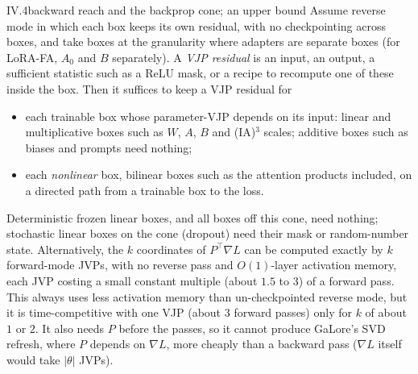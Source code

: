 \begin{observation}{IV.4}{backward reach and the backprop cone; an upper bound}
Assume reverse mode in which each box keeps its own residual, with no checkpointing across boxes, and take boxes at the
granularity where adapters are separate boxes (for LoRA-FA, $A_0$ and $B$ separately). A \emph{VJP residual} is an
input, an output, a sufficient statistic such as a ReLU mask, or a recipe to recompute one of these inside the box.
Then it suffices to keep a VJP residual for
\begin{itemize}
  \item each trainable box whose parameter-VJP depends on its input: linear and multiplicative boxes such as $W$, $A$,
  $B$ and (IA)$^3$ scales; additive boxes such as biases and prompts need nothing;
  \item each \emph{nonlinear} box, bilinear boxes such as the attention products included, on a directed path from a
  trainable box to the loss.
\end{itemize}
Deterministic frozen linear boxes, and all boxes off this cone, need nothing; stochastic linear boxes on the cone
(dropout) need their mask or random-number state. Alternatively, the $k$ coordinates of $P^\top\nabla L$ can be
computed exactly by $k$ forward-mode JVPs, with no reverse pass and $O(1)$-layer activation memory, each JVP costing a
small constant multiple (about $1.5$ to $3$) of a forward pass. This always uses less activation memory than
un-checkpointed reverse mode, but it is time-competitive with one VJP (about $3$ forward passes) only for $k$ of about
$1$ or $2$. It also needs $P$ before the passes, so it cannot produce GaLore's SVD refresh, where $P$ depends on
$\nabla L$, more cheaply than a backward pass ($\nabla L$ itself would take $\lvert\theta\rvert$ JVPs).
\end{observation}

